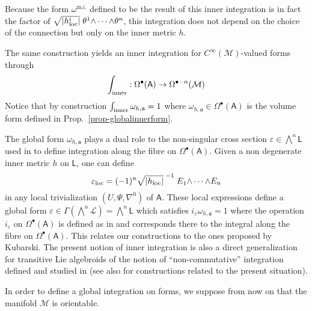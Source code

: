 \documentclass[number]{elsarticle}
\theoremstyle{definition}
\theoremstyle{remark}
\numberwithin{equation}{section}
\begin{document}
Because the form $\omega^{{\text{m.i.}}}$ defined to be the result of this inner integration is in fact the factor of $\sqrt{|h^i_{{\text{\textup{loc}}}}|}\; \theta^1 {\mathord{\wedge}} \cdots {\mathord{\wedge}} \theta^n$, this integration does not depend on the choice of the connection but only on the inner metric $h$.

The same construction yields an inner integration for $C^\infty({{{{\mathcal{{M}}}}}})$-valued forms through
\begin{equation*}
\int_{{\text{\textup{inner}}}} : \Omega^{\bullet}({{{{\mathbf{\mathsf{{A}}}}}}}) \rightarrow \Omega^{{\bullet}-n}({{{{\mathcal{{M}}}}}})
\end{equation*}
Notice that by construction $\int_{{\text{\textup{inner}}}} \omega_{h,{\mathfrak{a}}} =1$ where $\omega_{h,{\mathfrak{a}}} \in \Omega^{\bullet}({{{{\mathbf{\mathsf{{A}}}}}}})$ is the volume form defined in Prop.~\ref{prop-globalinnerform}.

The global form $\omega_{h,{\mathfrak{a}}}$ plays a dual role to the non-singular cross section $\varepsilon \in {{\textstyle\bigwedge}}^n {{{{\mathbf{\mathsf{{L}}}}}}}$ used in \cite{MR1908998} to define integration along the fibre on $\Omega^{\bullet}({{{{\mathbf{\mathsf{{A}}}}}}})$. Given a non degenerate inner metric $h$ on ${{{{\mathbf{\mathsf{{L}}}}}}}$, one can define
\begin{equation}
\label{eq-epsilonkubarski}
\varepsilon_{{\text{\textup{loc}}}} = (-1)^n \sqrt{|h_{{\text{\textup{loc}}}}|}^{\;-1}\; E_1 {\mathord{\wedge}} \cdots {\mathord{\wedge}} E_n
\end{equation}
in any local trivialization $(U, \Psi, \nabla^{0})$ of ${{{{\mathbf{\mathsf{{A}}}}}}}$. These local expressions define a global form $\varepsilon \in \Gamma({{\textstyle\bigwedge}}^n {{{{\mathcal{{L}}}}}}) = {{\textstyle\bigwedge}}^n {{{{\mathbf{\mathsf{{L}}}}}}}$ which satisfies $i_\varepsilon \omega_{h,{\mathfrak{a}}} = 1$ where the operation $i_\varepsilon$ on $\Omega^{\bullet}({{{{\mathbf{\mathsf{{A}}}}}}})$ is defined as in \cite{MR1908998} and corresponds there to the integral along the fibre on $\Omega^{\bullet}({{{{\mathbf{\mathsf{{A}}}}}}})$. This relates our constructions to the ones proposed by Kubarski. The present notion of inner integration is also a direct generalization for transitive Lie algebroids of the notion of ``non-commutative'' integration defined and studied in \cite{Mass15} (see also \cite{Mass30} for constructions related to the present situation).

In order to define a global integration on forms, we suppose from now on that the manifold ${{{{\mathcal{{M}}}}}}$ is orientable.
\end{document}
